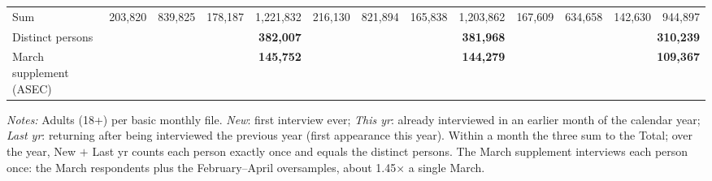 \documentclass[11pt]{article}
\begin{document}
\begin{center}
\begin{threeparttable}
\begin{tabular}{l rrrr rrrr rrrr}
\midrule
Sum & 203,820 & 839,825 & 178,187 & 1,221,832 & 216,130 & 821,894 & 165,838 & 1,203,862 & 167,609 & 634,658 & 142,630 & 944,897 \\
Distinct persons & \multicolumn{4}{r}{\textbf{382,007}} & \multicolumn{4}{r}{\textbf{381,968}} & \multicolumn{4}{r}{\textbf{310,239}} \\
March supplement (ASEC) & \multicolumn{4}{r}{\textbf{145,752}} & \multicolumn{4}{r}{\textbf{144,279}} & \multicolumn{4}{r}{\textbf{109,367}} \\
\bottomrule
\end{tabular}
\begin{tablenotes}[flushleft]
\footnotesize
\item \emph{Notes:} Adults (18+) per basic monthly file. \emph{New}:
first interview ever; \emph{This yr}: already interviewed in an earlier
month of the calendar year; \emph{Last yr}: returning after being
interviewed the previous year (first appearance this year). Within a
month the three sum to the Total; over the year, New $+$ Last yr counts
each person exactly once and equals the distinct persons. The March
supplement interviews each person once: the March respondents plus the
February--April oversamples, about 1.45$\times$ a single March.
\end{tablenotes}
\end{threeparttable}
\end{center}
\end{document}
